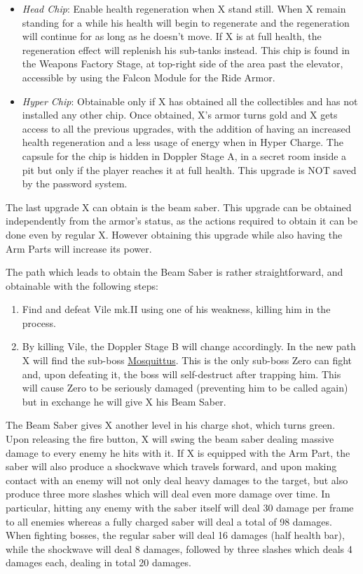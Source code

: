 \begin{itemize}
	
	\item \emph{Head Chip}: Enable health regeneration when X stand still. When X remain standing for a while his health will begin to regenerate and the regeneration will continue for as long as he doesn't move. If X is at full health, the regeneration effect will replenish his sub-tanks instead. This chip is found in the Weapons Factory Stage, at top-right side of the area past the elevator, accessible by using the Falcon Module for the Ride Armor.
	
	\item \emph{Hyper Chip}: Obtainable only if X has obtained all the collectibles and has not installed any other chip. Once obtained, X's armor turns gold and X gets access to all the previous upgrades, with the addition of having an increased health regeneration and a less usage of energy when in Hyper Charge. The capsule for the chip is hidden in Doppler Stage A, in a secret room inside a pit but only if the player reaches it at full health. This upgrade is NOT saved by the password system.

\end{itemize}
The last upgrade X can obtain is the beam saber. This upgrade can be obtained independently from the armor's status, as the actions required to obtain it can be done even by regular X. However obtaining this upgrade while also having the Arm Parts will increase its power.

The path which leads to obtain the Beam Saber is rather straightforward, and obtainable with the following steps:
\begin{enumerate}
	\item Find and defeat Vile mk.II using one of his weakness, killing him in the process.
	\item By killing Vile, the Doppler Stage B will change accordingly. In the new path X will find the sub-boss  \hyperlink{miniboss:Mosquittus}{Mosquittus}. This is the only sub-boss Zero can fight and, upon defeating it, the boss will self-destruct after trapping him. This will cause Zero to be seriously damaged (preventing him to be called again) but in exchange he will give X his Beam Saber.
\end{enumerate} 
The Beam Saber gives X another level in his charge shot, which turns green. Upon releasing the fire button, X will swing the beam saber dealing massive damage to every enemy he hits with it. If X is equipped with the Arm Part, the saber will also produce a shockwave which travels forward, and upon making contact with an enemy will not only deal heavy damages to the target, but also produce three more slashes which will deal even more damage over time. In particular, hitting any enemy with the saber itself will deal 30 damage per frame to all enemies whereas a fully charged saber will deal a total of 98 damages. When fighting bosses, the regular saber will deal 16 damages (half health bar), while the shockwave will deal 8 damages, followed by three slashes which deals 4 damages each, dealing in total 20 damages.

